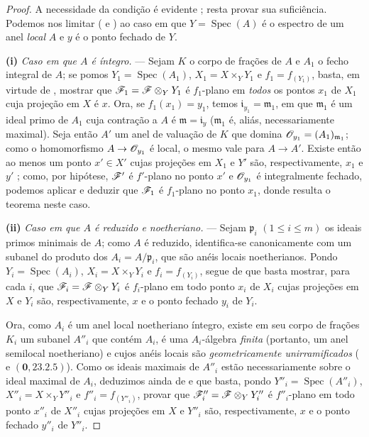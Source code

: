 \begin{proof}
A necessidade da condição
é evidente ;
resta provar sua suficiência.
Podemos nos limitar
( e
) ao caso
em que
$Y=\operatorname{Spec}(A)$
é o espectro de um anel
\emph{local} $A$ e $y$ é o
ponto fechado de $Y$.

\medskip
\noindent\textbf{(i)}
\emph{Caso em que $A$ é
íntegro.} --- Sejam $K$ o
corpo de frações de $A$ e
$A_1$ o fecho integral de
$A$; se pomos
$Y_1=\operatorname{Spec}(A_1)$,
$X_1=X\times_Y Y_1$ e
$f_1=f_{(Y_1)}$, basta,
em virtude de
, mostrar
que
$\mathscr{F}_1=\mathscr{F}\otimes_Y Y_1$
é $f_1$-plano em \emph{todos}
os pontos $x_1$ de $X_1$
cuja projeção em $X$ é $x$.
Ora, se $f_1(x_1)=y_1$,
temos
$\mathfrak i_{y_1}=\mathfrak m_1$,
em que $\mathfrak m_1$ é um
ideal primo de $A_1$ cuja
contração a $A$ é
$\mathfrak m=\mathfrak i_y$
($\mathfrak m_1$ é, aliás,
necessariamente maximal).
Seja então $A'$ um anel de
valuação de $K$ que domina
$\mathscr{O}_{y_1}=(A_1)_{\mathfrak m_1}$;
como o homomorfismo
$A\to\sh{O}_{y_1}$ é local,
o mesmo vale para
$A\to A'$. Existe então
ao menos um
ponto $x'\in X'$ cujas
projeções em $X_1$ e $Y'$
são, respectivamente,
$x_1$ e $y'$
; como,
por hipótese, $\mathscr{F}'$
é $f'$-plano no ponto $x'$
e $\mathscr{O}_{y_1}$ é
integralmente fechado,
podemos aplicar
 e deduzir
que $\mathscr{F}_1$ é $f_1$-plano
no ponto $x_1$, donde
resulta o teorema neste caso.

\medskip
\noindent\textbf{(ii)}
\emph{Caso em que $A$ é
reduzido e noetheriano.}
--- Sejam $\mathfrak p_i$
$(1\leq i\leq m)$ os ideais
primos minimais de $A$;
como $A$ é reduzido,
identifica-se canonicamente
com um subanel do produto
dos
$A_i=A/\mathfrak p_i$,
que são anéis locais
noetherianos. Pondo
$Y_i=\operatorname{Spec}(A_i)$,
$X_i=X\times_Y Y_i$ e
$f_i=f_{(Y_i)}$,
segue de 
que basta mostrar, para
cada $i$, que
$\mathscr{F}_i=\mathscr{F}\otimes_Y Y_i$
é $f_i$-plano em todo
ponto $x_i$ de $X_i$ cujas
projeções em $X$ e $Y_i$
são, respectivamente,
$x$ e o ponto fechado
$y_i$ de $Y_i$.

Ora, como $A_i$ é um anel
local noetheriano íntegro,
existe em seu corpo de
frações $K_i$ um subanel
$A''_i$ que contém $A_i$,
é uma $A_i$-álgebra
\emph{finita} (portanto, um
anel semilocal noetheriano)
e cujos anéis locais são
\emph{geometricamente
unirramificados}
( e
$(\mathbf 0,23.2.5)$).
Como os ideais maximais de
$A''_i$ estão necessariamente
sobre o ideal maximal de
$A_i$, deduzimos ainda de
 e
 que basta,
pondo
$Y''_i=\operatorname{Spec}(A''_i)$,
$X''_i=X\times_Y Y''_i$ e
$f''_i=f_{(Y''_i)}$,
provar que
$\mathscr{F}''_i=\mathscr{F}\otimes_Y Y''_i$
é $f''_i$-plano em todo
ponto $x''_i$ de $X''_i$
cujas projeções em $X$ e
$Y''_i$ são,
respectivamente, $x$ e o
ponto fechado $y''_i$ de
$Y''_i$.


\end{proof}
